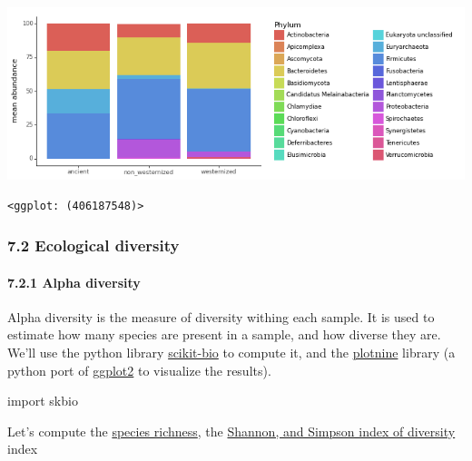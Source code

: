 \documentclass[
  letterpaper,
]{book}
\let\oldparagraph\paragraph
\renewcommand{\paragraph}[1]{\oldparagraph{#1}\mbox{}}
\newenvironment{Shaded}{}{}
\newcommand{\ImportTok}[1]{\textcolor[rgb]{0.01,0.18,0.38}{#1}}
\newcommand{\NormalTok}[1]{\textcolor[rgb]{0.14,0.16,0.18}{#1}}
\begin{document}
\includegraphics{assets/images/chapters/taxonomic-profiling/analysis_80_0.png}

\begin{verbatim}
<ggplot: (406187548)>
\end{verbatim}

\hypertarget{ecological-diversity}{%
\subsubsection{7.2 Ecological diversity}\label{ecological-diversity}}

\hypertarget{alpha-diversity}{%
\paragraph{7.2.1 Alpha diversity}\label{alpha-diversity}}

Alpha diversity is the measure of diversity withing each sample. It is
used to estimate how many species are present in a sample, and how
diverse they are.\\
We'll use the python library \href{http://scikit-bio.org/}{scikit-bio}
to compute it, and the \href{https://plotnine.readthedocs.io/}{plotnine}
library (a python port of
\href{https://ggplot2.tidyverse.org/reference/ggplot.html}{ggplot2} to
visualize the results).

\begin{Shaded}
\begin{Highlighting}[]
\ImportTok{import}\NormalTok{ skbio}
\end{Highlighting}
\end{Shaded}

Let's compute the
\href{https://en.wikipedia.org/wiki/Species_richness}{species richness},
the
\href{https://www.biologydiscussion.com/biodiversity/types/2-types-of-diversity-indices-of-biodiversity/8388}{Shannon,
and Simpson index of diversity} index
\end{document}
